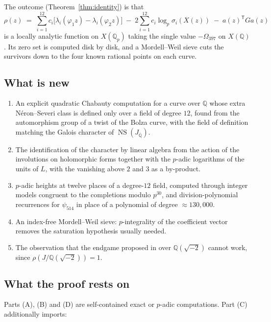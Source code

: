 \documentclass[11pt,reqno]{amsart}
\theoremstyle{plain}
\theoremstyle{definition}
\newcommand{\Q}{\mathbb{Q}}
\newcommand{\Qbar}{\overline{\Q}}
\DeclareMathOperator{\NS}{NS}
\numberwithin{equation}{section}
\begin{document}
The outcome (Theorem~\ref{thm:identity}) is that
\[
  \rho(z)\;=\;\sum_{i=1}^{12}c_{i}\bigl[\lambda_{i}(\varphi_{1}z)-\lambda_{i}(\varphi_{2}z)\bigr]
  \;-\;2\sum_{i=1}^{12}c_{i}\log_{p}\sigma_{i}(X(z))\;-\;a(z)^{\mathsf T}Ga(z)
\]
is a locally analytic function on $X(\Q_{p})$ taking the single value
$-\Omega_{397}$ on $X(\Q)$. Its zero set is computed disk by disk, and a
Mordell--Weil sieve cuts the survivors down to the four known rational points on
each curve.

\subsection{What is new}

\begin{enumerate}[label=(\arabic*),leftmargin=2.4em]
\item An explicit quadratic Chabauty computation for a curve over $\Q$ whose
      extra N\'eron--Severi class is defined only over a field of degree $12$,
      found from the automorphism group of a twist of the Bolza curve, with
      the field of definition matching the Galois character of
      $\NS(J_{\Qbar})$.
\item The identification of the character by linear algebra from the action of
      the involutions on holomorphic forms together with the $p$-adic
      logarithms of the units of $L$, with the vanishing above $2$ and $3$ as a
      by-product.
\item $p$-adic heights at twelve places of a degree-$12$ field, computed through
      integer models congruent to the completions modulo $p^{30}$, and
      division-polynomial recurrences for $\psi_{514}$ in place of a polynomial
      of degree ${\approx}130{,}000$.
\item An index-free Mordell--Weil sieve: $p$-integrality of the coefficient
      vector removes the saturation hypothesis usually needed.
\item The observation that the endgame proposed in \cite{Villines} over
      $\Q(\sqrt{-2})$ cannot work, since $\rho(J/\Q(\sqrt{-2}))=1$.
\end{enumerate}

\subsection{What the proof rests on}\label{subsec:rests}

Parts (A), (B) and (D) are self-contained exact or $p$-adic computations. Part
(C) additionally imports:
\end{document}

